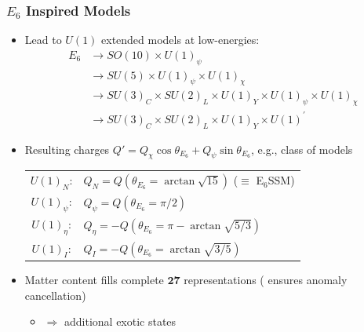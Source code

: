 \documentclass[10pt,aspectratio=169]{beamer}
\begin{document}
\begin{frame}
\begin{columns}[t]
\begin{column}{0.6\textwidth}
\begin{figure}
      \end{figure}
    \end{column}
  \end{columns}
\end{frame}

\begin{frame}
  \frametitle{$E_6$ Inspired Models}
  \begin{itemize} \itemsep1em
     \item Lead to $U(1)$ extended models at low-energies:
      \begin{align*}
        E_6&\longrightarrow SO(10)\times U(1)_\psi \\
        &\longrightarrow SU(5)\times U(1)_\psi\times U(1)_\chi\\
        &\longrightarrow SU(3)_C\times SU(2)_L\times U(1)_Y\times
        U(1)_\psi\times U(1)_\chi\\
        &\longrightarrow SU(3)_C\times SU(2)_L\times U(1)_Y\times
        U(1)^\prime
      \end{align*}
    \item Resulting charges $Q' = Q_\chi \cos \theta_{E_6}
      + Q_\psi \sin \theta_{E_6}$, e.g., class of models
      \begin{table}[h]
        \begin{tabular}{cl}
          $U(1)_N$: & $Q_N = Q(\theta_{E_6} = \arctan\sqrt{15})$
            ($\equiv$ E$_6$SSM) \\
          $U(1)_\psi$: & $Q_\psi = Q(\theta_{E_6} = \pi / 2)$\\
          $U(1)_\eta$: & $Q_\eta = -Q(\theta_{E_6} = \pi -
            \arctan\sqrt{5/3})$\\
          $U(1)_I$: & $Q_I = -Q(\theta_{E_6} = \arctan\sqrt{3/5})$
        \end{tabular}
      \end{table}
    \item Matter content fills complete $\mathbf{27}$ representations
      ({\color{blue} ensures anomaly cancellation})
      \begin{itemize}
        \item $\Rightarrow$ additional exotic states
      \end{itemize}
  \end{itemize}
\end{frame}
\end{document}
